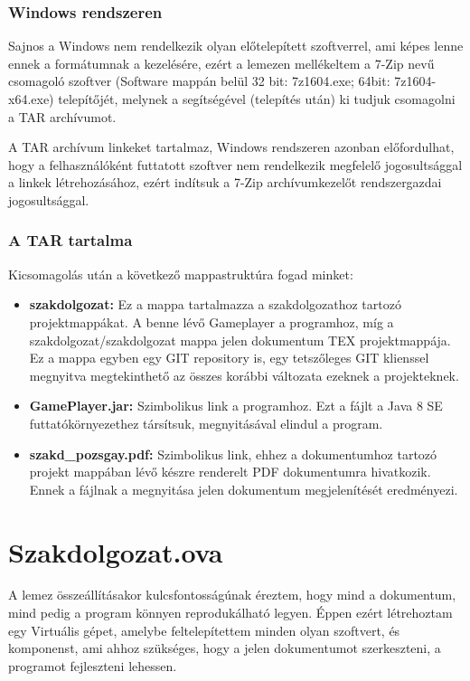 \subsubsection{Windows rendszeren}
Sajnos a Windows nem rendelkezik olyan előtelepített szoftverrel, ami képes lenne ennek a formátumnak a kezelésére, ezért a lemezen mellékeltem a 7-Zip nevű csomagoló szoftver (Software mappán belül 32 bit: 7z1604.exe; 64bit: 7z1604-x64.exe) telepítőjét, melynek a segítségével (telepítés után) ki tudjuk csomagolni a TAR archívumot.

\begin{remark}
	A TAR archívum linkeket tartalmaz, Windows rendszeren azonban előfordulhat, hogy a felhasználóként futtatott szoftver nem rendelkezik megfelelő jogosultsággal a linkek létrehozásához, ezért indítsuk a 7-Zip archívumkezelőt rendszergazdai jogosultsággal.
\end{remark}

\subsubsection{A TAR tartalma}
Kicsomagolás után a következő mappastruktúra fogad minket:
\begin{itemize}
	\item \textbf{szakdolgozat:} Ez a mappa tartalmazza a szakdolgozathoz tartozó projektmappákat. A benne lévő Gameplayer a programhoz, míg a szakdolgozat/szakdolgozat mappa jelen dokumentum TEX projektmappája. Ez a mappa egyben egy GIT repository is, egy tetszőleges GIT klienssel megnyitva megtekinthető az összes korábbi változata ezeknek a projekteknek.
	\item \textbf{GamePlayer.jar:} Szimbolikus link a programhoz. Ezt a fájlt a Java 8 SE futtatókörnyezethez társítsuk, megnyitásával elindul a program.
	\item \textbf{szakd\_pozsgay.pdf:} Szimbolikus link, ehhez a dokumentumhoz tartozó projekt mappában lévő készre renderelt PDF dokumentumra hivatkozik. Ennek a fájlnak a megnyitása jelen dokumentum megjelenítését eredményezi.
\end{itemize}

\section{Szakdolgozat.ova}
A lemez összeállításakor kulcsfontosságúnak éreztem, hogy mind a dokumentum, mind pedig a program könnyen reprodukálható legyen. Éppen ezért létrehoztam egy Virtuális gépet, amelybe feltelepítettem minden olyan szoftvert, és komponenst, ami ahhoz szükséges, hogy a jelen dokumentumot szerkeszteni, a programot fejleszteni lehessen.\ujsor

